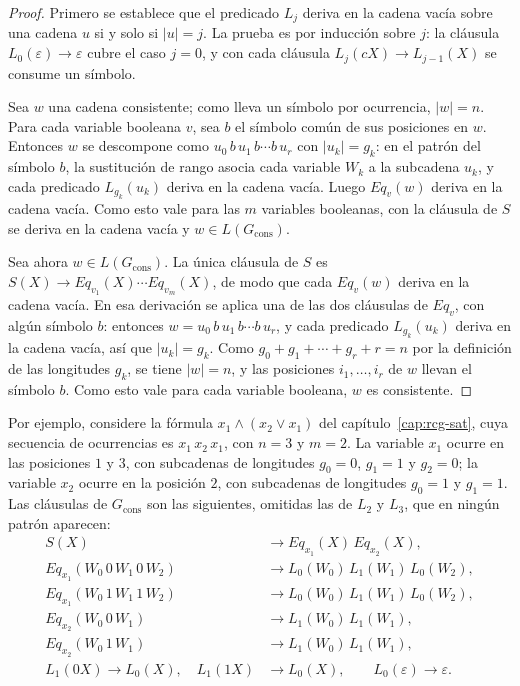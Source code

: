 \documentclass{report}
\theoremstyle{definition}
\theoremstyle{plain}
\theoremstyle{remark}
\begin{document}
\begin{proof}
Primero se establece que el predicado $L_j$ deriva en la cadena vacía
sobre una cadena $u$ si y solo si $|u| = j$. La prueba es por
inducción sobre $j$: la cláusula $L_0(\varepsilon) \to \varepsilon$
cubre el caso $j = 0$, y con cada cláusula $L_j(cX) \to L_{j-1}(X)$
se consume un símbolo.

Sea $w$ una cadena consistente; como lleva un símbolo por ocurrencia,
$|w| = n$. Para cada variable booleana $v$, sea $b$ el símbolo común
de sus posiciones en $w$. Entonces $w$ se descompone como
$u_0\, b\, u_1\, b \cdots b\, u_r$ con $|u_k| = g_k$: en el patrón
del símbolo $b$, la sustitución de rango asocia cada variable $W_k$ a
la subcadena $u_k$, y cada predicado $L_{g_k}(u_k)$ deriva en la
cadena vacía. Luego $Eq_v(w)$ deriva en la cadena vacía. Como esto
vale para las $m$ variables booleanas, con la cláusula de $S$ se
deriva en la cadena vacía y $w \in L(G_{\mathrm{cons}})$.

Sea ahora $w \in L(G_{\mathrm{cons}})$. La única cláusula de $S$ es
$S(X) \to Eq_{v_1}(X) \cdots Eq_{v_m}(X)$, de modo que cada $Eq_v(w)$
deriva en la cadena vacía. En esa derivación se aplica una de las dos
cláusulas de $Eq_v$, con algún símbolo $b$: entonces
$w = u_0\, b\, u_1\, b \cdots b\, u_r$, y cada predicado
$L_{g_k}(u_k)$ deriva en la cadena vacía, así que $|u_k| = g_k$. Como
$g_0 + g_1 + \cdots + g_r + r = n$ por la definición de las
longitudes $g_k$, se tiene $|w| = n$, y las posiciones
$i_1, \ldots, i_r$ de $w$ llevan el símbolo $b$. Como esto vale para
cada variable booleana, $w$ es consistente.
\end{proof}

Por ejemplo, considere la fórmula $x_1 \wedge (x_2 \vee x_1)$ del
capítulo~\ref{cap:rcg-sat}, cuya secuencia de ocurrencias es
$x_1\,x_2\,x_1$, con $n=3$ y $m=2$. La variable $x_1$ ocurre en las
posiciones $1$ y $3$, con subcadenas de longitudes $g_0=0$, $g_1=1$ y
$g_2=0$; la variable $x_2$ ocurre en la posición $2$, con subcadenas
de longitudes $g_0=1$ y $g_1=1$. Las cláusulas de $G_{\mathrm{cons}}$
son las siguientes, omitidas las de $L_2$ y $L_3$, que en ningún
patrón aparecen:
\[
\begin{aligned}
  S(X) &\to Eq_{x_1}(X)\, Eq_{x_2}(X),\\
  Eq_{x_1}(W_0\,0\,W_1\,0\,W_2) &\to L_0(W_0)\, L_1(W_1)\, L_0(W_2),\\
  Eq_{x_1}(W_0\,1\,W_1\,1\,W_2) &\to L_0(W_0)\, L_1(W_1)\, L_0(W_2),\\
  Eq_{x_2}(W_0\,0\,W_1) &\to L_1(W_0)\, L_1(W_1),\\
  Eq_{x_2}(W_0\,1\,W_1) &\to L_1(W_0)\, L_1(W_1),\\
  L_1(0X) \to L_0(X), \quad L_1(1X) &\to L_0(X), \qquad
  L_0(\varepsilon) \to \varepsilon.
\end{aligned}
\]
\end{document}
